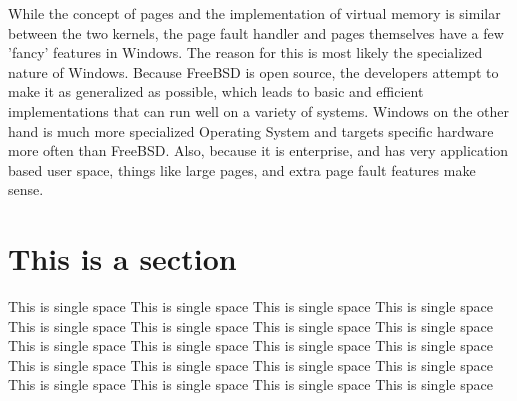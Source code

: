 \documentclass[titlepage]{article}
\begin{document}
\begin{singlespace}
While the concept of pages and the implementation of virtual memory is similar between the two kernels, the page fault handler and pages themselves have a few 'fancy' features in Windows. The reason for this is most likely the specialized nature of Windows. Because FreeBSD is open source, the developers attempt to make it as generalized as possible, which leads to basic and efficient implementations that can run well on a variety of systems. Windows on the other hand is much more specialized Operating System and targets specific hardware more often than FreeBSD. Also, because it is enterprise, and has very application based user space, things like large pages, and extra page fault features make sense.\\ 

\end{singlespace}

\section{This is a section}
\begin{singlespace}
This is single space This is single space This is single space This is single space This is single space This is single space This is single space This is single space  This is single space This is single space This is single space This is single space  This is single space This is single space This is single space This is single space  This is single space This is single space This is single space This is single space  
\end{singlespace}

\newpage


\end{document}
